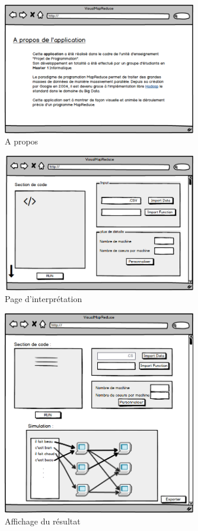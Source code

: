 \documentclass[12pt,a4paper]{article}
\begin{document}
\begin{figure}[H]
  \centering
    \includegraphics[width=0.75\textwidth]{images/interface/page_a_propos.png}
    \caption{A propos}
\end{figure}

\begin{figure}[H]
  \centering
    \includegraphics[width=0.75\textwidth]{images/interface/page_interpret1.png}
    \caption{Page d'interprétation}
\end{figure}

\begin{figure}[H]
  \centering
    \includegraphics[width=0.75\textwidth]{images/interface/page_interpret2.png}
    \caption{Affichage du résultat}
\end{figure}
\end{document}

